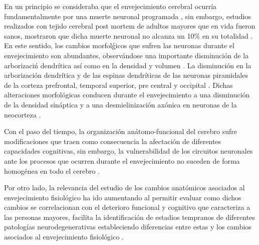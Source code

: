 En un principio se consideraba que el envejecimiento cerebral ocurr\'ia fundamentalmente por una 
muerte neuronal programada \cite{Coleman87}, sin embargo, estudios realizados con tejido cerebral 
post mortem de adultos mayores que en vida fueron sanos, mostraron que dicha muerte neuronal no 
alcanza un 10\% en su totalidad \cite{Esiri07}. En este sentido, los cambios morfol\'gicos que 
sufren las neuronas durante el envejecimiento son abundantes, observ\'andose una importante 
disminuci\'on de la arborizaci\'n dendr\'itica as\'i como en la densidad y volumen \cite{Hita14}. 
La disminución en la arborización dendr\'itica y de las espinas dendr\'iticas de las neuronas 
piramidales de la corteza prefrontal, temporal superior, pre central y occipital \cite{Hita14}. 
Dichas alteraciones morfol\'ogicas conducen durante el envejecimiento a una disminuci\'on de 
la densidad sin\'aptica y a una desmielinizaci\'on ax\'onica en neuronas de la 
neocorteza \cite{Terry}.

Con el paso del tiempo, la organizaci\'on an\'atomo-funcional del cerebro sufre modificaciones 
que traen como consecuencia la afectaci\'on de diferentes capacidades cognitivas, sin embargo, 
la vulnerabilidad de los circuitos neuronales ante los procesos que ocurren durante el 
envejecimiento no suceden de forma homog\'enea en todo el cerebro \cite{Hita14}.

Por otro lado, la relevancia del estudio de los cambios anat\'omicos asociados al envejecimiento 
fisiol\'ogico ha ido aumentando al permitir evaluar como dichos cambios se correlacionan con 
el deterioro funcional y cognitivo que caracteriza a las personas mayores, facilita la 
identificaci\'on de estadios tempranos de diferentes patolog\'ias neurodegenerativas estableciendo 
diferencias entre estas y los cambios asociados al envejecimiento fisiol\'ogico \cite{Hita14}.



